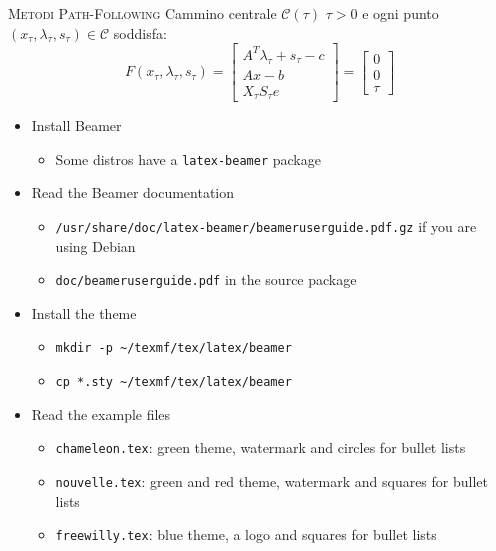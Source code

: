 \begin{frame}[t]{\textsc{\LARGE Metodi Path-Following}}
	Cammino centrale $\mathcal{C}(\tau)$ $\tau  > 0$ e ogni punto $(x_{\tau}, \lambda_{\tau}, s_{\tau})\in \mathcal{C}$ soddisfa:
		\begin{equation*}
\mathit{F}(x_{\tau},\lambda_{\tau},s_{\tau})= \begin{bmatrix}
A^{T}\lambda_{\tau}+s_{\tau}-c \\Ax-b \\X_{\tau}S_{\tau}e
\end{bmatrix}=\begin{bmatrix}0\\0\\ \tau \end{bmatrix}
\end{equation*}
	
\end{frame}

\begin{frame}
\begin{itemize}
\item Install Beamer
  \begin{itemize}
  \item Some distros have a \verb!latex-beamer! package
  \end{itemize}
\item Read the Beamer documentation
  \begin{itemize}
  \item \verb!/usr/share/doc/latex-beamer/beameruserguide.pdf.gz! if you are
        using Debian
  \item \verb!doc/beameruserguide.pdf! in the source package
  \end{itemize}
\item Install the theme
  \begin{itemize}
  \item \verb!mkdir -p ~/texmf/tex/latex/beamer!\\
  \item \verb!cp *.sty ~/texmf/tex/latex/beamer!
  \end{itemize}
\item Read the example files
  \begin{itemize}
  \item \verb!chameleon.tex!: green theme, watermark and circles for bullet
        lists
  \item \verb!nouvelle.tex!: green and red theme, watermark and squares for
        bullet lists
  \item \verb!freewilly.tex!: blue theme, a logo and squares for bullet lists
  \end{itemize}
\end{itemize}
\end{frame}

